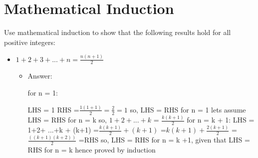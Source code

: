 \documentclass[11pt]{article}
\begin{document}
\section{Mathematical Induction}

Use mathematical induction to show that the following results hold for all positive integers:



\begin{itemize}

\item $ 1 + 2 + 3 + ... + n = \frac{n(n+1)} {2} $

\begin{itemize}

\item Answer: 

for n = 1:

LHS = 1
\newline RHS =$ \frac{1(1+1)} {2}= \frac{2}{2} = 1 $ 
\newline so, LHS = RHS for n = 1
\newline lets assume LHS = RHS for n = k
\newline so, $ 1+ 2 +...+ k $ = $ \frac{k(k+1)}{2} $
\newline for n = k + 1:
\newline LHS = 1+2+ ...+k + (k+1)
\newline =$\frac{k(k+1)}{2} + (k+1)$
\newline =$k(k+1) + \frac {2(k+1)}{2}$
\newline =$\frac {((k+1)(k+2))}{2}$
\newline =RHS
\newline so, LHS = RHS for n = k +1, given that LHS = RHS for n = k 
\newline hence proved by induction
\end{itemize} 

\end{itemize} 
\end{document}
